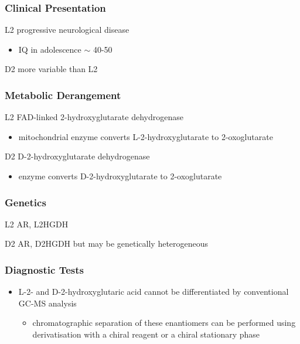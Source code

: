 \documentclass{scrartcl}
\begin{document}
\subsubsection{Clinical Presentation}
\label{sec:org4665906}
\begin{description}
\item{L2} progressive neurological disease
\begin{itemize}
\item IQ in adolescence \(\sim\) 40-50
\end{itemize}
\item{D2} more variable than L2
\end{description}

\subsubsection{Metabolic Derangement}
\label{sec:org589e628}
\begin{description}
\item{L2} FAD-linked 2-hydroxyglutarate dehydrogenase
\begin{itemize}
\item mitochondrial enzyme converts L-2-hydroxyglutarate to
2-oxoglutarate
\end{itemize}
\item{D2} D-2-hydroxyglutarate dehydrogenase
\begin{itemize}
\item enzyme converts D-2-hydroxyglutarate to 2-oxoglutarate
\end{itemize}
\end{description}

\subsubsection{Genetics}
\label{sec:org7ac19b8}
\begin{description}
\item{L2} AR, L2HGDH
\item{D2} AR, D2HGDH but may be genetically heterogeneous
\end{description}

\subsubsection{Diagnostic Tests}
\label{sec:org886cb87}
\begin{itemize}
\item L-2- and D-2-hydroxyglutaric acid cannot be differentiated by
conventional GC-MS analysis
\begin{itemize}
\item chromatographic separation of these enantiomers can be performed
using derivatisation with a chiral reagent or a chiral stationary
phase
\end{itemize}
\end{itemize}
\end{document}
